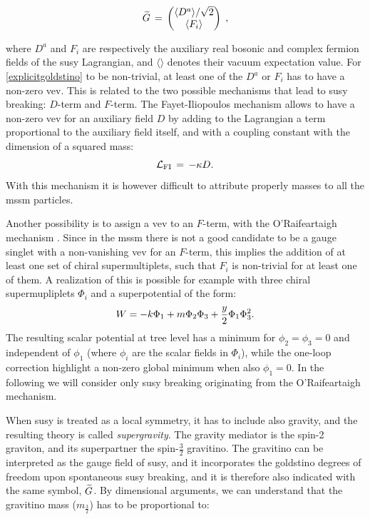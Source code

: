 \begin{equation}
 \widetilde{G} \,=\, 
 \begin{pmatrix}
\langle D^a \rangle /\sqrt{2} \cr \langle F_i\rangle 
\end{pmatrix} \; ,
\label{explicitgoldstino}
\end{equation} 

\noindent where $D^a$ and $F_i$ are respectively the auxiliary real bosonic and complex fermion fields of the \gls{susy} Lagrangian, and $\langle \rangle $ denotes their vacuum expectation value. For \ref{explicitgoldstino} to be non-trivial, at least one of the $D^a$ or $F_i$ has to have a non-zero \gls{vev}. This is related to the two possible mechanisms that lead to \gls{susy} breaking: $D$-term and $F$-term. 
The Fayet-Iliopoulos mechanism \cite{Fayet:1974jb} allows to have a non-zero \gls{vev} for an auxiliary field $D$ by adding to the Lagrangian a term proportional to the auxiliary field itself, and with a coupling constant with the dimension of a squared mass:
\begin{equation}
\mathcal{L}_{\rm FI} \,=\, -\kappa D .
\end{equation}
With this mechanism it is however difficult to attribute properly masses to all the \gls{mssm} particles.

Another possibility is to assign a \gls{vev} to an $F$-term, with the O’Raifeartaigh mechanism \cite{ORaifeartaigh:1975nky}. Since in the \gls{mssm} there is not a good candidate to be a gauge singlet with a non-vanishing \gls{vev} for an $F$-term, this implies the addition of at least one set of chiral supermultiplets, such that $F_i$ is non-trivial for at least one of them. A realization of this is possible for example with three chiral supermupliplets $\Phi_i$ and a superpotential of the form:
\begin{equation}
W = -k \Phi_1 + m \Phi_2 \Phi_3 + {y\over 2} \Phi_1 \Phi_3^2 .
\label{oraif}
\end{equation}
The resulting scalar potential at tree level has a minimum for $\phi_2=\phi_3=0$ and independent of $\phi_1$ (where $\phi_i$ are the scalar fields in $\Phi_i$), while the one-loop correction highlight a non-zero global minimum when also $\phi_1=0$. In the following we will consider only \gls{susy} breaking originating from the O’Raifeartaigh mechanism.


When \gls{susy} is treated as a local symmetry, it has to include also gravity, and the resulting theory is called \textit{supergravity}. The gravity mediator is the spin-2 graviton, and its superpartner the spin-$\frac{3}{2}$ gravitino. The gravitino can be interpreted as the gauge field of \gls{susy}, and it incorporates the goldstino degrees of freedom upon spontaneous \gls{susy} breaking, and it is therefore also indicated with the same symbol, $\widetilde{G}$. By dimensional arguments, we can understand that the gravitino mass ($m_{\frac{3}{2}}$) has to be proportional to:

